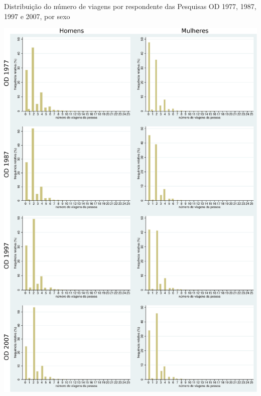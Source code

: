 \begin{grafico}[htb]%
    \caption{\label{graf:distr-num-viag}Distribuição do número de viagens por respondente das Pesquisas OD 1977, 1987, 1997 e 2007, por sexo}%
    \begin{center}%
        \includegraphics[width=1\textwidth]{./imagens/qtdeviagens2.eps}%
    \end{center}%
\end{grafico}%

